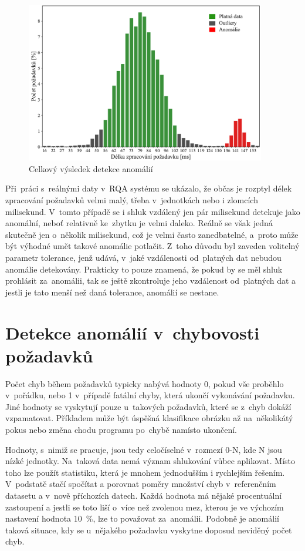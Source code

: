 \begin{figure}[!hbt]
    \centering
    \includegraphics[width=0.935\textwidth]{obrazky/anomaly-detection-histogram.pdf}
    \caption{Celkový výsledek detekce anomálií}
    \label{anomaly-detection-histogram-img}
\end{figure}

Při~práci s~reálnými daty v~RQA systému se ukázalo, že občas je rozptyl délek zpracování požadavků velmi malý, třeba v~jednotkách nebo i zlomcích milisekund. V~tomto případě se i shluk vzdálený jen pár milisekund detekuje jako anomální, neboť relativně ke~zbytku je velmi daleko. Reálně se však jedná skutečně jen o~několik milisekund, což je velmi často zanedbatelné, a~proto může být výhodné umět takové anomálie potlačit. Z~toho důvodu byl zaveden volitelný parametr tolerance, jenž udává, v~jaké vzdálenosti od~platných dat nebudou anomálie detekovány. Prakticky to pouze znamená, že pokud by se měl shluk prohlásit za~anomálii, tak se ještě zkontroluje jeho vzdálenost od~platných dat a jestli je tato menší než daná tolerance, anomálií se nestane.

\section{Detekce anomálií v~chybovosti požadavků}
\label{detekce-anomálii-v-chybach}
Počet chyb během požadavků typicky nabývá hodnoty 0, pokud vše proběhlo v~pořádku, nebo 1 v~případě fatální chyby, která ukončí vykonávání požadavku. Jiné hodnoty se vyskytují pouze u~takových požadavků, které se z~chyb dokáží vzpamatovat. Příkladem může být úspěšná klasifikace obrázku až na~několikátý pokus nebo změna chodu programu po~chybě namísto ukončení.

Hodnoty, s~nimiž se pracuje, jsou tedy celočíselné v~rozmezí 0-N, kde N jsou nízké jednotky. Na~taková data nemá význam shlukování vůbec aplikovat. Místo toho lze použít statistiku, která je mnohem jednodušším i rychlejším řešením. V~podstatě stačí spočítat a porovnat poměry množství chyb v~referenčním datasetu a v~nově příchozích datech. Každá hodnota má nějaké procentuální zastoupení a jestli se toto liší o~více než zvolenou mez, kterou je ve výchozím nastavení hodnota 10~\%, lze to považovat za~anomálii. Podobně je anomálií taková situace, kdy se u~nějakého požadavku vyskytne doposud neviděný počet chyb.

